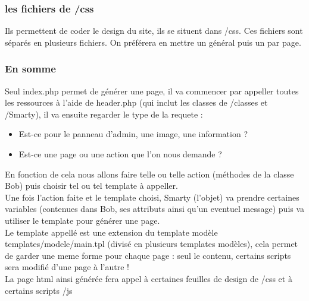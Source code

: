 \subsubsection{les fichiers de /css}
	Ils permettent de coder le design du site, ils se situent dans /css. Ces fichiers sont séparés en plusieurs fichiers. On préférera en mettre un général puis un par page.
\newpage
\subsubsection{En somme}
Seul index.php permet de générer une page, il va commencer par appeller toutes les ressources à l'aide de header.php (qui inclut les classes de /classes et /Smarty), il va ensuite regarder le type de la requete :
\begin{itemize}
\item Est-ce pour le panneau d'admin, une image, une information ?
\item Est-ce une page ou une action que l'on nous demande ?
\end{itemize}

En fonction de cela nous allons faire telle ou telle action (méthodes de la classe Bob) puis choisir tel ou tel template à appeller.\\

Une fois l'action faite et le template choisi, Smarty (l'objet) va prendre certaines variables (contenues dans Bob, ses attributs ainsi qu'un eventuel message) puis va utiliser le template pour générer une page.\\

Le template appellé est une extension du template modèle templates/modele/main.tpl (divisé en plusieurs templates modèles),
cela permet de garder une meme forme pour chaque page : seul le contenu, certains scripts sera modifié d'une page à l'autre !\\

La page html ainsi générée fera appel à certaines feuilles de design de /css et à certains scripts /js